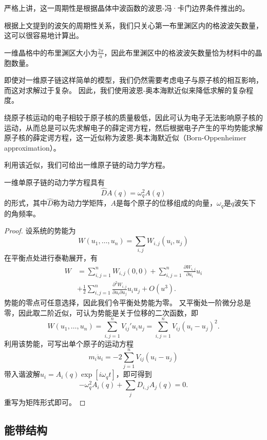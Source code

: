 严格上讲，这一周期性是根据晶体中波函数的波恩-冯·卡门边界条件推出的。

根据上文提到的波矢的周期性关系，我们只关心第一布里渊区内的格波波矢数量，这可以很容易地计算出。
\begin{corollary}
    一维晶格中的布里渊区大小为$\frac{2\pi}{a}$，因此布里渊区中的格波波矢数量恰为材料中的晶胞数量。
\end{corollary}

即使对一维原子链这样简单的模型，我们仍然需要考虑电子与原子核的相互影响，而这对求解过于复杂。
因此，我们使用波恩-奥本海默近似来降低求解的复杂程度。
\begin{theorem}
    绕原子核运动的电子相较于原子核的质量极低，因此可认为电子无法影响原子核的运动，从而总是可以先求解电子的薛定谔方程，然后根据电子产生的平均势能求解原子核的薛定谔方程，这一近似称为波恩-奥本海默近似（Born-Oppenheimer approximation）。
\end{theorem}

利用该近似，我们可给出一维原子链的动力学方程。
\begin{proposition}
    一维单原子链的动力学方程具有
    \begin{equation}
        \hat D A(q) = \omega_q^2 A(q)
    \end{equation}
    的形式，其中$\hat D$称为动力学矩阵，$A$是每个原子的位移组成的向量，$\omega_q$是$q$波矢下的角频率。
\end{proposition}

\begin{proof}
    设系统的势能为
    \begin{equation}
        W(u_1, \dots, u_n) = \sum_{i,j} W_{i,j} (u_i, u_j)
    \end{equation}
    在平衡点处进行泰勒展开，有
    \begin{equation}
        \begin{aligned}
            W &= \sum_{i,j=1}^n W_{i,j}(0,0) + \sum_{i,j=1}^n \frac{\partial W_{i,j}}{\partial u_i} u_i \\
            &+ \frac{1}{2} \sum_{i,j=1}^n \frac{\partial^2 W_{i,j}}{\partial u_i \partial u_j} u_i u_j + O(u^3).
        \end{aligned}
    \end{equation}
    势能的零点可任意选择，因此我们令平衡处势能为零。
    又平衡处一阶微分总是零，因此取二阶近似，可认为势能是关于位移的二次函数，即
    \begin{equation}
        W(u_1, \dots, u_n) = \sum_{i,j=1}^n V_{ij}' u_i u_j  = \sum_{i,j=1}^n V_{ij} (u_i - u_j)^2.
    \end{equation}
    利用该势能，可写出单个原子的运动方程
    \begin{equation}
        m_i \ddot u_i = - 2 \sum_{j=1}^n V_{ij}(u_i - u_j)
    \end{equation}
    带入谐波解$u_i = A_i(q) \exp[i \omega_q t]$，即可得到
    \begin{equation}
        - \omega_q^2 A_i(q) + \sum_j D_{i,j} A_j(q) = 0.
    \end{equation}
    重写为矩阵形式即可。
\end{proof}

\subsection{能带结构}
